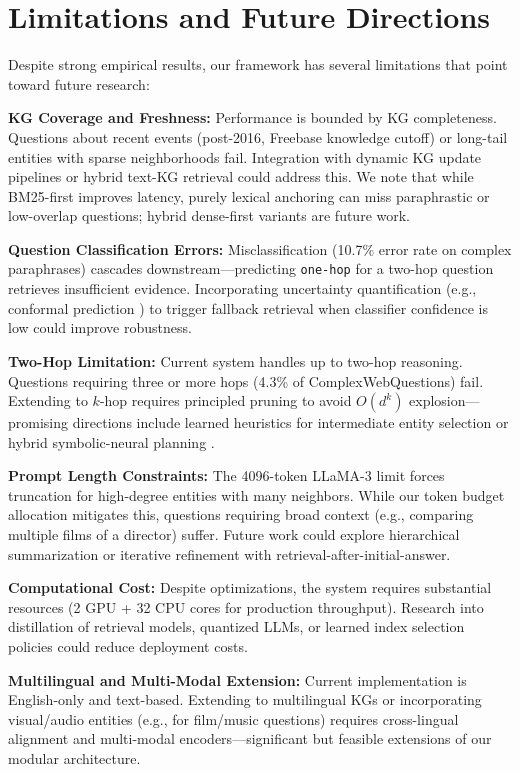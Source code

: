\documentclass[conference]{IEEEtran}
\begin{document}
\section{Limitations and Future Directions}

Despite strong empirical results, our framework has several limitations that point toward future research:

\textbf{KG Coverage and Freshness:} Performance is bounded by KG completeness. Questions about recent events (post-2016, Freebase knowledge cutoff) or long-tail entities with sparse neighborhoods fail. Integration with dynamic KG update pipelines \cite{lehmann2015dbpedia} or hybrid text-KG retrieval \cite{sun2018graftnet} could address this. We note that while BM25-first improves latency, purely lexical anchoring can miss paraphrastic or low-overlap questions; hybrid dense-first variants are future work.

\textbf{Question Classification Errors:} Misclassification (10.7\% error rate on complex paraphrases) cascades downstream—predicting \texttt{one-hop} for a two-hop question retrieves insufficient evidence. Incorporating uncertainty quantification (e.g., conformal prediction \cite{angelopoulos2021gentle}) to trigger fallback retrieval when classifier confidence is low could improve robustness.

\textbf{Two-Hop Limitation:} Current system handles up to two-hop reasoning. Questions requiring three or more hops (4.3\% of ComplexWebQuestions) fail. Extending to $k$-hop requires principled pruning to avoid $O(d^k)$ explosion—promising directions include learned heuristics for intermediate entity selection or hybrid symbolic-neural planning \cite{yao2023react,schick2024toolformer}.

\textbf{Prompt Length Constraints:} The 4096-token LLaMA-3 limit forces truncation for high-degree entities with many neighbors. While our token budget allocation mitigates this, questions requiring broad context (e.g., comparing multiple films of a director) suffer. Future work could explore hierarchical summarization \cite{sarthi2024raptor} or iterative refinement with retrieval-after-initial-answer.

\textbf{Computational Cost:} Despite optimizations, the system requires substantial resources (2 GPU + 32 CPU cores for production throughput). Research into distillation of retrieval models, quantized LLMs, or learned index selection policies could reduce deployment costs.

\textbf{Multilingual and Multi-Modal Extension:} Current implementation is English-only and text-based. Extending to multilingual KGs \cite{lehmann2015dbpedia} or incorporating visual/audio entities (e.g., for film/music questions) requires cross-lingual alignment and multi-modal encoders—significant but feasible extensions of our modular architecture.
\end{document}
